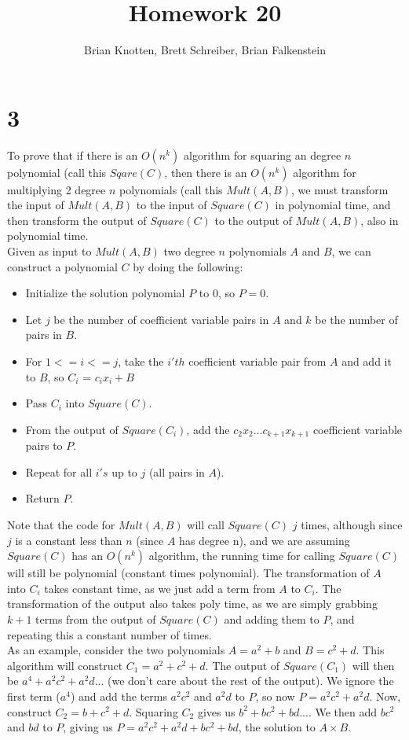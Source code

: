 \documentclass[letterpaper,notitlepage,twoside]{article}
\begin{document}
\title{Homework 20}
\author{Brian Knotten, Brett Schreiber, Brian Falkenstein}
\maketitle
\section*{3}
To prove that if there is an $O(n^k)$ algorithm for squaring an degree $n$ polynomial (call this $Sqare(C)$, then there is an $O(n^k)$ algorithm for multiplying 2 degree $n$ polynomials (call this $Mult(A, B)$, we must transform the input of $Mult(A, B)$ to the input of $Square(C)$ in polynomial time, and then transform the output of $Square(C)$ to the output of $Mult(A, B)$, also in polynomial time. \\
Given as input to $Mult(A, B)$ two degree $n$ polynomials $A$ and $B$, we can construct a polynomial $C$ by doing the following: 
\begin{itemize}
\item Initialize the solution polynomial $P$ to 0, so $P=0$. 
\item Let $j$ be the number of coefficient variable pairs in $A$ and $k$ be the number of pairs in $B$. 
\item For $1<=i<=j$, take the $i'th$ coefficient variable pair from $A$ and add it to $B$, so $C_i$ = $c_ix_i + B$
\item Pass $C_i$ into $Square(C)$.
\item From the output of $Square(C_i)$, add the $c_2x_2 ... c_{k+1}x_{k+1}$ coefficient variable pairs to $P$. 
\item Repeat for all $i's$ up to $j$ (all pairs in $A$). 
\item Return $P$. 
\end{itemize}
Note that the code for $Mult(A, B)$ will call $Square(C)$ $j$ times, although since $j$ is a constant less than $n$ (since $A$ has degree n), and we are assuming $Square(C)$ has an $O(n^k)$ algorithm, the running time for calling $Square(C)$ will still be polynomial (constant times polynomial). The transformation of $A$ into $C_i$ takes constant time, as we just add a term from $A$ to $C_i$. The transformation of the output also takes poly time, as we are simply grabbing $k+1$ terms from the output of $Square(C)$ and adding them to $P$, and repeating this a constant number of times. \\
As an example, consider the two polynomials $A=a^2 + b$ and $B = c^2 + d$. This algorithm will construct $C_1 = a^2 + c^2 + d$. The output of $Square(C_1)$ will then be $a^4 + a^2c^2 + a^2d...$ (we don't care about the rest of the output). We ignore the first term ($a^4$) and add the terms $a^2c^2$ and $a^2d$ to $P$, so now $P = a^2c^2 + a^2d$. Now, construct $C_2 = b + c^2 + d$. Squaring $C_2$ gives us $b^2 + bc^2 + bd ...$. We then add $bc^2$ and $bd$ to $P$, giving us $P=a^2c^2 + a^2d + bc^2 + bd$, the solution to $A\times B$. 
\end{document}
